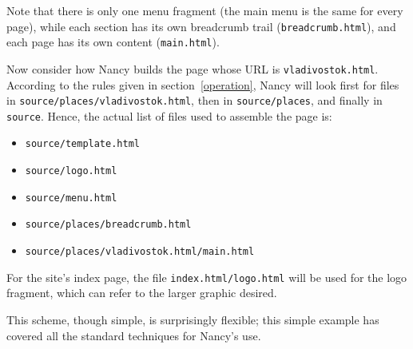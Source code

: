 \documentclass[english]{scrartcl}
\begin{document}
Note that there is only one menu fragment (the main menu is the same for every page), while each section has its own breadcrumb trail (\verb|breadcrumb.html|), and each page has its own content (\verb|main.html|).

Now consider how Nancy builds the page whose URL is \verb|vladivostok.html|. According to the rules given in section~\ref{operation}, Nancy will look first for files in \verb|source/places/vladivostok.html|, then in \verb|source/places|, and finally in \verb|source|. Hence, the actual list of files used to assemble the page is:

\begin{itemize}
\item \verb|source/template.html|
\item \verb|source/logo.html|
\item \verb|source/menu.html|
\item \verb|source/places/breadcrumb.html|
\item \verb|source/places/vladivostok.html/main.html|
\end{itemize}

For the site’s index page, the file \verb|index.html/logo.html| will be used for the logo fragment, which can refer to the larger graphic desired.

This scheme, though simple, is surprisingly flexible; this simple example has covered all the standard techniques for Nancy’s use.
\end{document}

